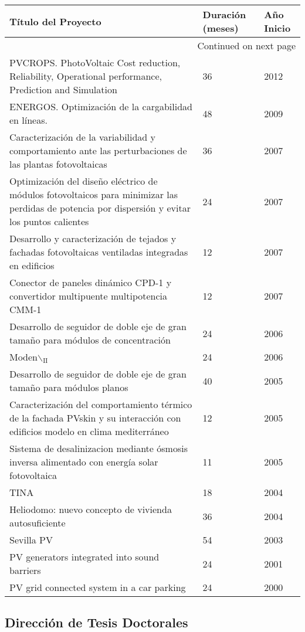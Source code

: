 \documentclass[article, a4paper]{memoir}
\begin{document}
\begin{longtable}{p{110mm}|p{17mm}|p{25mm}}
Título del Proyecto & Duración (meses) & Año Inicio\\
\hline
\endhead
\hline\multicolumn{3}{r}{Continued on next page} \\
\endfoot
\endlastfoot
PVCROPS. PhotoVoltaic Cost reduction, Reliability, Operational performance, Prediction and Simulation & 36 & 2012\\
ENERGOS. Optimización de la cargabilidad en líneas. & 48 & 2009\\
Caracterización de la variabilidad y comportamiento ante las perturbaciones de las plantas fotovoltaicas & 36 & 2007\\
Optimización del diseño eléctrico de módulos fotovoltaicos para minimizar las perdidas de potencia por dispersión y evitar los puntos calientes & 24 & 2007\\
Desarrollo y caracterización de tejados y fachadas fotovoltaicas ventiladas integradas en edificios & 12 & 2007\\
Conector de paneles dinámico CPD-1 y convertidor multipuente multipotencia CMM-1 & 12 & 2007\\
Desarrollo de seguidor de doble eje de gran tamaño para módulos de concentración & 24 & 2006\\
Moden$\backslash$$_{\text{II}}$ & 24 & 2006\\
Desarrollo de seguidor de doble eje de gran tamaño para módulos planos & 40 & 2005\\
Caracterización del comportamiento térmico de la fachada PVskin y su interacción con edificios modelo en clima mediterráneo & 12 & 2005\\
Sistema de desalinizacion mediante ósmosis inversa alimentado con energía solar fotovoltaica & 11 & 2005\\
TINA & 18 & 2004\\
Heliodomo: nuevo concepto de vivienda autosuficiente & 36 & 2004\\
Sevilla PV & 54 & 2003\\
PV generators integrated into sound barriers & 24 & 2001\\
PV grid connected system in a car parking & 24 & 2000\\
\end{longtable}

\subsection{Dirección de Tesis Doctorales}
\label{sec-4-4}
\end{document}
